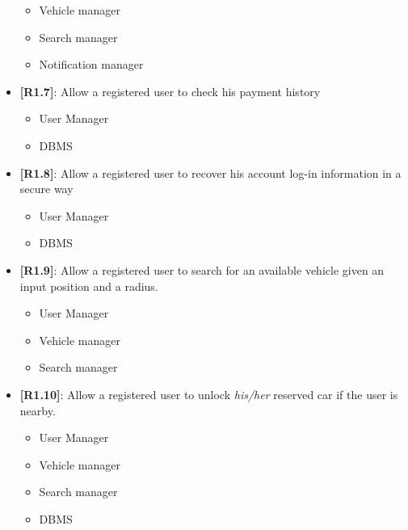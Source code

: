 \begin{itemize}
\begin{itemize}
	\item Vehicle manager
	\item Search manager
	\item Notification manager
	\end{itemize}
	\item{\textbf{[R1.7]}}: Allow a registered user to check his payment history\\
	\begin{itemize}
	\item User Manager
	\item DBMS
	\end{itemize}
	\item{\textbf{[R1.8]}}: Allow a registered user to recover his account log-in information in a secure way\\
	\begin{itemize}
	\item User Manager
	\item DBMS
	\end{itemize}
	\item{\textbf{[R1.9]}}: Allow a registered user to search for an available vehicle given an input position and a radius.\\
	\begin{itemize}
	\item User Manager
	\item Vehicle manager
	\item Search manager
	\end{itemize}
	\item{\textbf{[R1.10]}}: Allow a registered user to unlock \emph{his/her} reserved car if the user is nearby.\\
	\begin{itemize}
	\item User Manager
	\item Vehicle manager
	\item Search manager
	\item DBMS
	\end{itemize}
\end{itemize}

